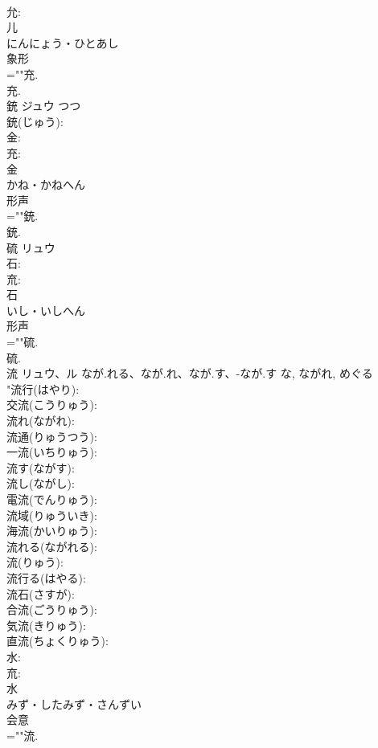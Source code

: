 \documentclass[8pt]{extreport}
\begin{document}
\begin{CJK}{UTF8}{min}
\\	允: 
\\	儿	
\\	にんにょう・ひとあし	
\\	象形 
\\	=""充.
\\	充.
\\	銃	ジュウ	つつ		
\\	銃(じゅう): 
\\	金: 
\\	充: 
\\	金	
\\	かね・かねへん	
\\	形声 
\\	=""銃.
\\	銃.
\\	硫	リュウ			
\\	石: 
\\	㐬: 
\\	石	
\\	いし・いしへん	
\\	形声 
\\	=""硫.
\\	硫.
\\	流	リュウ、ル	なが.れる、なが.れ、なが.す、-なが.す	な, ながれ, めぐる	
\\	"流行(はやり): 
\\	交流(こうりゅう): 
\\	流れ(ながれ): 
\\	流通(りゅうつう): 
\\	一流(いちりゅう): 
\\	流す(ながす): 
\\	流し(ながし): 
\\	電流(でんりゅう): 
\\	流域(りゅういき): 
\\	海流(かいりゅう): 
\\	流れる(ながれる): 
\\	流(りゅう): 
\\	流行る(はやる): 
\\	流石(さすが): 
\\	合流(ごうりゅう): 
\\	気流(きりゅう): 
\\	直流(ちょくりゅう): 
\\	水: 
\\	㐬: 
\\	水	
\\	みず・したみず・さんずい	
\\	会意 
\\	=""流.

\end{CJK}
\end{document}
